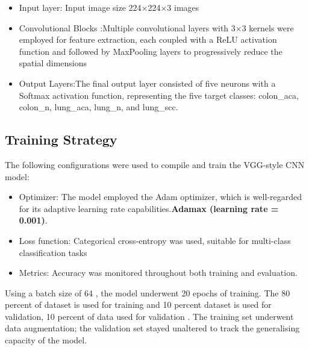 \documentclass{ieeeaccess}
\begin{document}
\begin{itemize}
    \item Input layer: Input image size 224$\times$224$\times$3 images
    \item Convolutional Blocks :Multiple convolutional layers with 3×3 kernels were employed for feature extraction, each coupled with a ReLU activation function and followed by MaxPooling layers to progressively reduce the spatial dimensions
    \item {Output Layers}:The final output layer consisted of five neurons with a Softmax activation function, representing the five target classes: colon\_aca, colon\_n, lung\_aca, lung\_n, and lung\_scc.
\end{itemize}


\subsection{Training Strategy}
The following configurations were used to compile and train the VGG-style CNN model:
\begin{itemize}
    \item Optimizer: The model employed the Adam optimizer, which is well-regarded for its adaptive learning rate capabilities.\textbf{Adamax (learning rate = 0.001)}.
    \item Loss function: Categorical cross-entropy was used, suitable for multi-class classification tasks
    \item Metrics: Accuracy was monitored throughout both training and evaluation.
\end{itemize}
Using a batch size of 64 , the model underwent 20 epochs of training. The 80 percent of dataset is used for
training and 10 percent  dataset is used for validation, 10 percent of data used for validation . The training set underwent data augmentation; the validation set stayed
unaltered to track the generalising capacity of the model.
\end{document}
